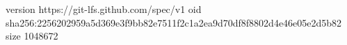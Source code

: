 version https://git-lfs.github.com/spec/v1
oid sha256:2256202959a5d369e3f9bb82e7511f2c1a2ea9d70df8f8802d4e46e05e2d5b82
size 1048672
